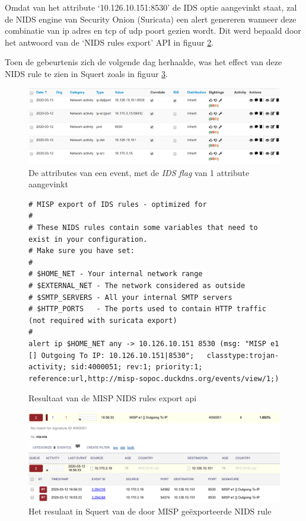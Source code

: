 \documentclass[a4paper, 12pt]{report}
\begin{document}
Omdat van het attribute `10.126.10.151:8530' de IDS optie aangevinkt staat, zal de NIDS engine van Security Onion (Suricata) een alert genereren wanneer deze combinatie van ip adres en tcp of udp poort gezien wordt.
Dit werd bepaald door het antwoord van de `NIDS rules export' API in figuur \ref{fig:misp-export-txt}.

Toen de gebeurtenis zich de volgende dag herhaalde, was het effect van deze NIDS rule te zien in Squert zoals in figuur \ref{fig:misp-export-squert}.

\begin{figure}[H]
  \centering
  \includegraphics[width=\textwidth]{misp-export-flag}
  \caption{De attributes van een event, met de \emph{IDS flag} van 1 attribute aangevinkt}
  \label{fig:misp-export-flag}
\end{figure}

\begin{figure}[H]
  \begin{lstlisting}
# MISP export of IDS rules - optimized for 
#
# These NIDS rules contain some variables that need to exist in your configuration.
# Make sure you have set:
#
# $HOME_NET - Your internal network range
# $EXTERNAL_NET - The network considered as outside
# $SMTP_SERVERS - All your internal SMTP servers
# $HTTP_PORTS   - The ports used to contain HTTP traffic (not required with suricata export)
# 
alert ip $HOME_NET any -> 10.126.10.151 8530 (msg: "MISP e1 [] Outgoing To IP: 10.126.10.151|8530";   classtype:trojan-activity; sid:4000051; rev:1; priority:1; reference:url,http://misp-sopoc.duckdns.org/events/view/1;)
  \end{lstlisting}
  \caption{Resultaat van de MISP NIDS rules export api}
  \label{fig:misp-export-txt}
\end{figure}

\begin{figure}[H]
  \centering
  \includegraphics[width=\textwidth]{misp-export-squert}
  \caption{Het resulaat in Squert van de door MISP geëxporteerde NIDS rule}
  \label{fig:misp-export-squert}
\end{figure}
\end{document}
